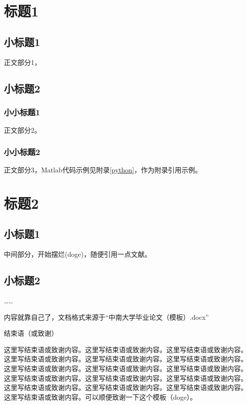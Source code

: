\newpage\vspace*{-21.6pt}

\section{标题1}
\subsection{小标题1}
正文部分1，
\subsection{小标题2}
\subsubsection{小小标题1}
正文部分2。
\subsubsection{小小标题2}
正文部分3，Matlab代码示例见附录\ref{python}，作为附录引用示例。
\newpage\vspace*{-21.6pt}
\section{标题2}
\subsection{小标题1}
中间部分，开始摆烂(doge)，随便引用一点文献\cite{IOTJA}。
\subsection{小标题2}
……

内容就靠自己了，文档格式来源于“中南大学毕业论文（模板）.docx”

\newpage\vspace*{-21.6pt}
\begin{center}
	\heiti
	结束语（或致谢）
\end{center}

这里写结束语或致谢内容。这里写结束语或致谢内容。这里写结束语或致谢内容。这里写结束语或致谢内容。这里写结束语或致谢内容。这里写结束语或致谢内容。这里写结束语或致谢内容。这里写结束语或致谢内容。这里写结束语或致谢内容。这里写结束语或致谢内容。这里写结束语或致谢内容。这里写结束语或致谢内容。这里写结束语或致谢内容。这里写结束语或致谢内容。这里写结束语或致谢内容。这里写结束语或致谢内容。可以顺便致谢一下这个模板（doge）。